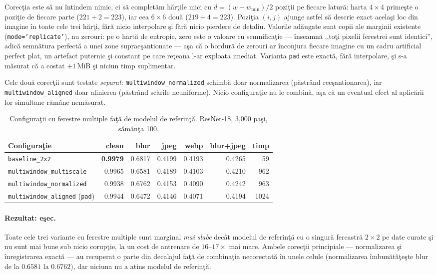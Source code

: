 Corecţia este să nu întindem nimic, ci să completăm hărţile mici cu
$d = (w-w_{\min})/2$ poziţii pe fiecare latură: harta $4\times4$ primeşte o
poziţie de fiecare parte ($221 + 2 = 223$), iar cea $6\times6$ două
($219 + 4 = 223$). Poziţia $(i,j)$ ajunge astfel să descrie exact acelaşi loc din
imagine în toate cele trei hărţi, fără nicio interpolare şi fără nicio pierdere
de detaliu. Valorile adăugate sunt copii ale marginii existente
(\texttt{mode='replicate'}), nu zerouri: pe o hartă de entropie, zero este o
valoare cu semnificaţie --- înseamnă ,,toţi pixelii ferestrei sunt identici'',
adică semnătura perfectă a unei zone supraeşantionate --- aşa că o bordură de
zerouri ar înconjura fiecare imagine cu un cadru artificial perfect plat, un
artefact puternic şi constant pe care reţeaua l-ar exploata imediat. Varianta
\texttt{pad} este exactă, fără interpolare, şi s-a măsurat că a costat
$+1$\,MiB şi niciun timp suplimentar.

Cele două corecţii sunt testate \emph{separat}: \texttt{multiwindow\_normalized}
schimbă doar normalizarea (păstrând reeşantionarea), iar
\texttt{multiwindow\_aligned} doar alinierea (păstrând scările neuniforme). Nicio
configuraţie nu le combină, aşa că un eventual efect al aplicării lor simultane
rămâne nemăsurat.

\begin{table}[t]
  \centering
  \caption{Configuraţii cu ferestre multiple faţă de modelul de referinţă.
  ResNet-18, 3{,}000 paşi, sămânţa 100.}
  \label{tab:multiwindow}
  \begin{tabular}{lrrrrrr}
    \toprule
    Configuraţie & clean & blur & jpeg & webp & blur+jpeg & timp \\
    \midrule
    \texttt{baseline\_2x2}                      & \textbf{0.9979} & 0.6817 & 0.4199 & 0.4193 & 0.4265 & 59 \\
    \texttt{multiwindow\_multiscale}            & 0.9965 & 0.6581 & 0.4189 & 0.4103 & 0.4210 & 962 \\
    \texttt{multiwindow\_normalized}            & 0.9938 & 0.6762 & 0.4153 & 0.4090 & 0.4242 & 963 \\
    \texttt{multiwindow\_aligned} (\texttt{pad})& 0.9944 & 0.6472 & 0.4146 & 0.4071 & 0.4194 & 1024 \\
    \bottomrule
  \end{tabular}
\end{table}

\paragraph{Rezultat: eşec.} Toate cele trei variante cu ferestre multiple sunt
marginal \emph{mai slabe} decât modelul de referinţă cu o singură fereastră
$2\times2$ pe date curate şi nu sunt mai bune sub nicio corupţie, la un cost de
antrenare de $16$--$17\times$ mai mare. Ambele corecţii principiale ---
normalizarea şi înregistrarea exactă --- au recuperat o parte din decalajul faţă
de combinaţia necorectată în unele celule (normalizarea îmbunătăţeşte blur de la
$0.6581$ la $0.6762$), dar niciuna nu a atins modelul de referinţă.

